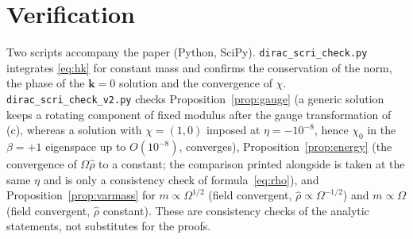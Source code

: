 \documentclass[11pt,a4paper]{article}
\theoremstyle{definition}
\begin{document}
\section*{Verification}
Two scripts accompany the paper (Python, SciPy). \texttt{dirac\_scri\_check.py} integrates \eqref{eq:hk} for constant mass and confirms the conservation of the norm, the phase of the $\mathbf{k}=0$ solution and the convergence of $\chi$. \texttt{dirac\_scri\_check\_v2.py} checks Proposition~\ref{prop:gauge} (a generic solution keeps a rotating component of fixed modulus after the gauge transformation of (c), whereas a solution with $\chi=(1,0)$ imposed at $\eta=-10^{-8}$, hence $\chi_{0}$ in the $\beta=+1$ eigenspace up to $O(10^{-8})$, converges), Proposition~\ref{prop:energy} (the convergence of $\Omega\hat\rho$ to a constant; the comparison printed alongside is taken at the same $\eta$ and is only a consistency check of formula~\eqref{eq:rho}), and Proposition~\ref{prop:varmass} for $m\propto\Omega^{1/2}$ (field convergent, $\hat\rho\propto\Omega^{-1/2}$) and $m\propto\Omega$ (field convergent, $\hat\rho$ constant). These are consistency checks of the analytic statements, not substitutes for the proofs.
\end{document}
